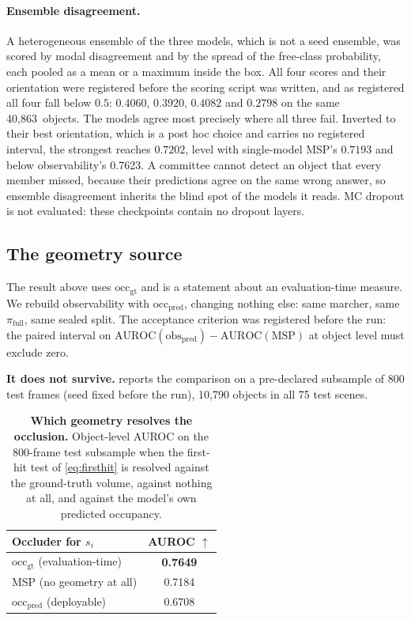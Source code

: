 \documentclass[10pt,twocolumn,letterpaper]{article}
\newcommand{\objObs}{0.7623}
\newcommand{\nObj}{40{,}863}
\begin{document}
\paragraph{Ensemble disagreement.}
A heterogeneous ensemble of the three models, which is not a seed ensemble,
was scored by modal disagreement and by the spread of the free-class
probability, each pooled as a mean or a maximum inside the box. All four
scores and their orientation were registered before the scoring script was
written, and as registered all four fall below $0.5$: $0.4060$, $0.3920$,
$0.4082$ and $0.2798$ on the same \nObj\ objects. The models agree most
precisely where all three fail. Inverted to their best orientation, which is a post hoc choice and carries
no registered interval, the strongest reaches $0.7202$, level with
single-model MSP's $0.7193$ and below observability's \objObs. A committee cannot detect an object that every
member missed, because their predictions agree on the same wrong answer,
so ensemble disagreement inherits the blind spot of the models it reads.
MC dropout is not evaluated: these checkpoints contain no dropout layers.

\subsection{The geometry source}
\label{sec:deployable}
The result above uses $\text{occ}_{\text{gt}}$ and is a statement about an
evaluation-time measure. We rebuild observability with
$\text{occ}_{\text{pred}}$, changing nothing else: same marcher, same
$\pi_{\text{full}}$, same sealed split. The acceptance criterion was
registered before the run: the paired interval on
$\mathrm{AUROC}(\text{obs}_{\text{pred}}) - \mathrm{AUROC}(\text{MSP})$ at
object level must exclude zero.

\textbf{It does not survive.}  reports the comparison on
a pre-declared subsample of 800 test frames (seed fixed before the run),
10{,}790 objects in all 75 test scenes.

\begin{table}[t]
\centering\small
\begin{tabular}{lc}
\toprule
Occluder for $s_i$ & AUROC $\uparrow$ \\
\midrule
$\text{occ}_{\text{gt}}$ \;(evaluation-time) & \textbf{0.7649} \\
MSP \;(no geometry at all)                   & 0.7184 \\
$\text{occ}_{\text{pred}}$ \;(deployable)    & 0.6708 \\
\bottomrule
\end{tabular}
\caption{\textbf{Which geometry resolves the occlusion.} Object-level AUROC on the 800-frame test subsample when the first-hit test of \cref{eq:firsthit} is resolved against the ground-truth volume, against nothing at all, and against the model's own predicted occupancy.}
\label{tab:occluder}
\end{table}
\end{document}
